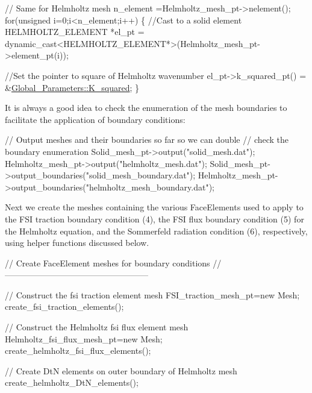 \begin{DoxyCodeInclude}
 

 \textcolor{comment}{// Same for Helmholtz mesh}
 n\_element =Helmholtz\_mesh\_pt->nelement();
 \textcolor{keywordflow}{for}(\textcolor{keywordtype}{unsigned} i=0;i<n\_element;i++)
  \{
   \textcolor{comment}{//Cast to a solid element}
   HELMHOLTZ\_ELEMENT *el\_pt = 
    \textcolor{keyword}{dynamic\_cast<}HELMHOLTZ\_ELEMENT*\textcolor{keyword}{>}(Helmholtz\_mesh\_pt->element\_pt(i));

   \textcolor{comment}{//Set the pointer to square of Helmholtz wavenumber}
   el\_pt->k\_squared\_pt() = &\hyperlink{namespaceGlobal__Parameters_a91a3fa265abaf9e724c668ee800ffb29}{Global\_Parameters::K\_squared};
  \}

\end{DoxyCodeInclude}


It is always a good idea to check the enumeration of the mesh boundaries to facilitate the application of boundary conditions\+:


\begin{DoxyCodeInclude}


 \textcolor{comment}{// Output meshes and their boundaries so far so we can double }
 \textcolor{comment}{// check the boundary enumeration}
 Solid\_mesh\_pt->output(\textcolor{stringliteral}{"solid\_mesh.dat"});
 Helmholtz\_mesh\_pt->output(\textcolor{stringliteral}{"helmholtz\_mesh.dat"});
 Solid\_mesh\_pt->output\_boundaries(\textcolor{stringliteral}{"solid\_mesh\_boundary.dat"});
 Helmholtz\_mesh\_pt->output\_boundaries(\textcolor{stringliteral}{"helmholtz\_mesh\_boundary.dat"});

\end{DoxyCodeInclude}


Next we create the meshes containing the various {\ttfamily Face\+Elements} used to apply to the F\+SI traction boundary condition (4), the F\+SI flux boundary condition (5) for the Helmholtz equation, and the Sommerfeld radiation condition (6), respectively, using helper functions discussed below.


\begin{DoxyCodeInclude}


 \textcolor{comment}{// Create FaceElement meshes for boundary conditions}
 \textcolor{comment}{//---------------------------------------------------}

 \textcolor{comment}{// Construct the fsi traction element mesh}
 FSI\_traction\_mesh\_pt=\textcolor{keyword}{new} Mesh;
 create\_fsi\_traction\_elements(); 

 \textcolor{comment}{// Construct the Helmholtz fsi flux element mesh}
 Helmholtz\_fsi\_flux\_mesh\_pt=\textcolor{keyword}{new} Mesh;
 create\_helmholtz\_fsi\_flux\_elements();

 \textcolor{comment}{// Create DtN elements on outer boundary of Helmholtz mesh}
 create\_helmholtz\_DtN\_elements();

\end{DoxyCodeInclude}


